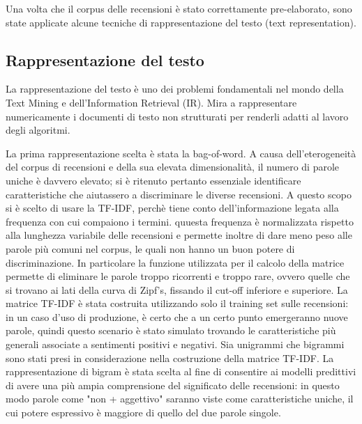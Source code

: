 \documentclass[fleqn,10pt]{SelfArx} %
\begin{document}
Una volta che il corpus delle recensioni è stato correttamente pre-elaborato, sono state applicate alcune tecniche di rappresentazione del testo (text representation).

\subsection{Rappresentazione del testo}

La rappresentazione del testo è uno dei problemi fondamentali nel mondo della Text Mining e dell'Information Retrieval (IR). Mira a rappresentare numericamente i documenti di testo non strutturati per renderli adatti al lavoro degli algoritmi.

La prima rappresentazione scelta è stata la bag-of-word. A causa dell'eterogeneità del corpus di recensioni e della sua elevata dimensionalità, il numero di parole uniche è davvero elevato; si è ritenuto pertanto essenziale identificare caratteristiche che aiutassero a discriminare le diverse recensioni. A questo scopo si è scelto di usare la TF-IDF, perchè tiene conto dell'informazione legata alla frequenza con cui compaiono i termini. quuesta frequenza è normalizzata rispetto alla lunghezza variabile delle recensioni e permette inoltre di dare meno peso alle parole più comuni nel corpus, le quali non hanno un buon potere di discriminazione. In particolare la funzione utilizzata per il calcolo della matrice permette di eliminare le parole troppo ricorrenti e troppo rare, ovvero quelle che si trovano ai lati della curva di Zipf's, fissando il cut-off inferiore e superiore.
La matrice TF-IDF è stata costruita utilizzando solo il training set sulle recensioni: in un caso d'uso di produzione, è certo che a un certo punto emergeranno nuove parole, quindi questo scenario è stato simulato trovando le caratteristiche più generali associate a sentimenti positivi e negativi. %
Sia unigrammi che bigrammi sono stati presi in considerazione nella costruzione della matrice TF-IDF. La rappresentazione di bigram è stata scelta al fine di consentire ai modelli predittivi di avere una più ampia comprensione del significato delle recensioni: in questo modo parole come "non + aggettivo" saranno viste come caratteristiche uniche, il cui potere espressivo è maggiore di quello del due parole singole.
\end{document}
